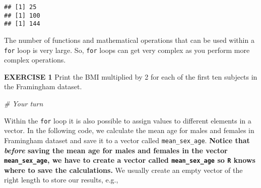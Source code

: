 \documentclass[
]{article}
\newenvironment{Shaded}{\begin{snugshade}}{\end{snugshade}}
\newcommand{\CommentTok}[1]{\textcolor[rgb]{0.56,0.35,0.01}{\textit{#1}}}
\newcommand{\ControlFlowTok}[1]{\textcolor[rgb]{0.13,0.29,0.53}{\textbf{#1}}}
\newcommand{\DataTypeTok}[1]{\textcolor[rgb]{0.13,0.29,0.53}{#1}}
\newcommand{\DecValTok}[1]{\textcolor[rgb]{0.00,0.00,0.81}{#1}}
\newcommand{\KeywordTok}[1]{\textcolor[rgb]{0.13,0.29,0.53}{\textbf{#1}}}
\newcommand{\NormalTok}[1]{#1}
\newcommand{\OperatorTok}[1]{\textcolor[rgb]{0.81,0.36,0.00}{\textbf{#1}}}
\newcommand{\StringTok}[1]{\textcolor[rgb]{0.31,0.60,0.02}{#1}}
\begin{document}
\begin{verbatim}
## [1] 25
## [1] 100
## [1] 144
\end{verbatim}

The number of functions and mathematical operations that can be used
within a \texttt{for} loop is very large. So, \texttt{for} loops can get
very complex as you perform more complex operations.

\textbf{EXERCISE 1} Print the BMI multiplied by 2 for each of the first
ten subjects in the Framingham dataset.

\begin{Shaded}
\begin{Highlighting}[]
\CommentTok{# Your turn}
\end{Highlighting}
\end{Shaded}

Within the \texttt{for} loop it is also possible to assign values to
different elements in a vector. In the following code, we calculate the
mean age for males and females in Framingham dataset and save it to a
vector called \texttt{mean\_sex\_age}. \textbf{Notice that \emph{before}
saving the mean age for males and females in the vector
\texttt{mean\_sex\_age}, we have to create a vector called
\texttt{mean\_sex\_age} so \texttt{R} knows where to save the
calculations.} We usually create an empty vector of the right length to
store our results, e.g.,

\begin{Shaded}
\end{Shaded}
\end{document}
